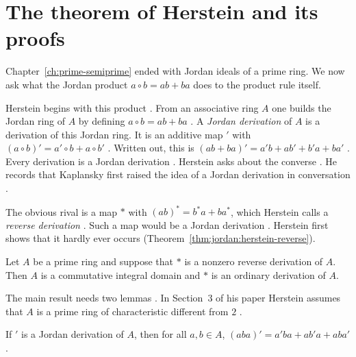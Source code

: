 \section{The theorem of Herstein and its proofs}\label{sec:jordan-type:herstein-theorem}

Chapter~\ref{ch:prime-semiprime} ended with Jordan ideals of a prime ring. We
now ask what the Jordan product $a\circ b=ab+ba$ does to the product rule
itself.

Herstein begins with this product \cite[p.~1104]{Herstein1957}. From an
associative ring $A$ one builds the Jordan ring of $A$ by defining $a\circ
b=ab+ba$ \cite[p.~1104]{Herstein1957}. A \emph{Jordan derivation} of $A$ is a
derivation of this Jordan ring. It is an additive map $'$ with $(a\circ
b)'=a'\circ b+a\circ b'$ \cite[p.~1104]{Herstein1957}. Written out, this is
$(ab+ba)'=a'b+ab'+b'a+ba'$ \cite[p.~1104]{Herstein1957}. Every derivation is a
Jordan derivation \cite[p.~1104]{Herstein1957}. Herstein asks about the converse
\cite[p.~1104]{Herstein1957}. He records that Kaplansky
first raised the idea of a Jordan derivation in conversation \cite[p.~1104,
footnote]{Herstein1957}.

The obvious rival is a map $*$ with $(ab)^*=b^*a+ba^*$, which Herstein calls a
\emph{reverse derivation} \cite[pp.~1104--1105]{Herstein1957}. Such a map
would be a Jordan derivation \cite[pp.~1104--1105]{Herstein1957}. Herstein first shows that it hardly ever occurs
(Theorem~\ref{thm:jordan:herstein-reverse}).

\begin{theorem}\label{thm:jordan:herstein-reverse}
Let $A$ be a prime ring and suppose that $*$ is a nonzero reverse derivation of $A$.
Then $A$ is a commutative integral domain and $*$ is an ordinary derivation of $A$.
\end{theorem}

The main result needs two lemmas \cite[p.~1106]{Herstein1957}. In Section~3
of his paper Herstein assumes that $A$ is a prime ring of characteristic
different from $2$ \cite[p.~1106]{Herstein1957}.

\begin{lemma}\label{lem:jordan:herstein-aba}
If $'$ is a Jordan derivation of $A$, then for all $a,b\in A$,
$(aba)'=a'ba+ab'a+aba'$.
\end{lemma}

